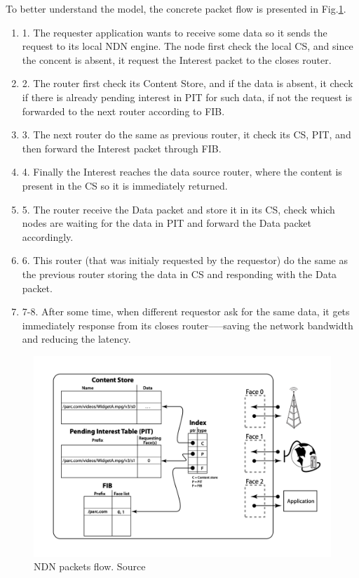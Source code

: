 To better understand the model, the concrete packet flow is presented in Fig.\ref{fig:ndn-flow}. 
\begin{enumerate}
    \item 1. The requester application wants to receive some data so it sends the request to its local NDN engine. The node first check the local CS, and since the concent is absent, it request the Interest packet to the closes router.
    \item 2. The router first check its Content Store, and if the data is absent, it check if there is already pending interest in PIT for such data, if not the request is forwarded to the next router according to FIB.  
    \item 3. The next router do the same as previous router, it check its CS, PIT, and then forward the Interest packet through FIB.
    \item 4. Finally the Interest reaches the data source router, where the content is present in the CS so it is immediately returned.
    \item 5. The router receive the Data packet and store it in its CS, check which nodes are waiting for the data in PIT and forward the Data packet accordingly.
    \item 6. This router (that was initialy requested by the requestor) do the same as the previous router storing the data in CS and responding with the Data packet.
    \item 7-8. After some time, when different requestor ask for the same data, it gets immediately response from its closes router–––saving the network bandwidth and reducing the latency.
\end{enumerate}

\begin{figure}[h]
    \centering
    \includegraphics[width=\linewidth]{img/ndn-operations.png}
    \caption{NDN packets flow. Source \cite{ahlgren2012survey}}
    \label{fig:ndn-flow}
\end{figure}

